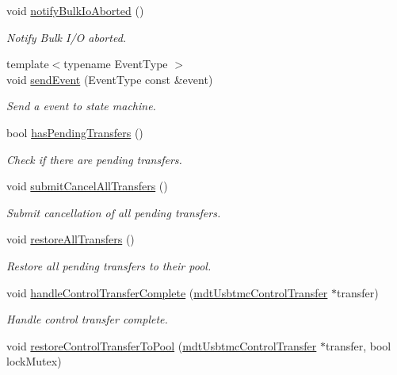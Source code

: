 \begin{DoxyCompactItemize}
void \hyperlink{classmdt_usbtmc_transfer_handler_a5f5c63210c3f75e7367911cb433b0070}{notify\-Bulk\-Io\-Aborted} ()
\begin{DoxyCompactList}\small\item\em Notify Bulk I/\-O aborted. \end{DoxyCompactList}\item 
{\footnotesize template$<$typename Event\-Type $>$ }\\void \hyperlink{classmdt_usbtmc_transfer_handler_afbc68b65a0c04b19948d0db5761d1f31}{send\-Event} (Event\-Type const \&event)
\begin{DoxyCompactList}\small\item\em Send a event to state machine. \end{DoxyCompactList}\item 
bool \hyperlink{classmdt_usbtmc_transfer_handler_a5e5b27c48d1b2f9937ac97a526febfdb}{has\-Pending\-Transfers} ()
\begin{DoxyCompactList}\small\item\em Check if there are pending transfers. \end{DoxyCompactList}\item 
void \hyperlink{classmdt_usbtmc_transfer_handler_a5622344f0456223485a474885df5a786}{submit\-Cancel\-All\-Transfers} ()
\begin{DoxyCompactList}\small\item\em Submit cancellation of all pending transfers. \end{DoxyCompactList}\item 
void \hyperlink{classmdt_usbtmc_transfer_handler_ab6249e4bfc67689b8eb35decace8cab9}{restore\-All\-Transfers} ()
\begin{DoxyCompactList}\small\item\em Restore all pending transfers to their pool. \end{DoxyCompactList}\item 
void \hyperlink{classmdt_usbtmc_transfer_handler_ac553e8fd400d969f866912f165436582}{handle\-Control\-Transfer\-Complete} (\hyperlink{classmdt_usbtmc_control_transfer}{mdt\-Usbtmc\-Control\-Transfer} $\ast$transfer)
\begin{DoxyCompactList}\small\item\em Handle control transfer complete. \end{DoxyCompactList}\item 
void \hyperlink{classmdt_usbtmc_transfer_handler_a2961d7f5121d2471602d39c7e3002e40}{restore\-Control\-Transfer\-To\-Pool} (\hyperlink{classmdt_usbtmc_control_transfer}{mdt\-Usbtmc\-Control\-Transfer} $\ast$transfer, bool lock\-Mutex)

\end{DoxyCompactItemize}
